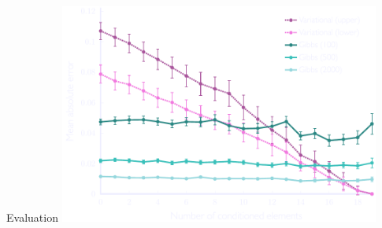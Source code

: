 \documentclass[mathserif]{beamer}
\begin{document}
\begin{frame}{Evaluation}
\vspace{1em}
\centering
\includegraphics[width=4.15in,trim=6 0 0 0,clip]{figures/floc_5.pdf}
\end{frame}
\end{document}
